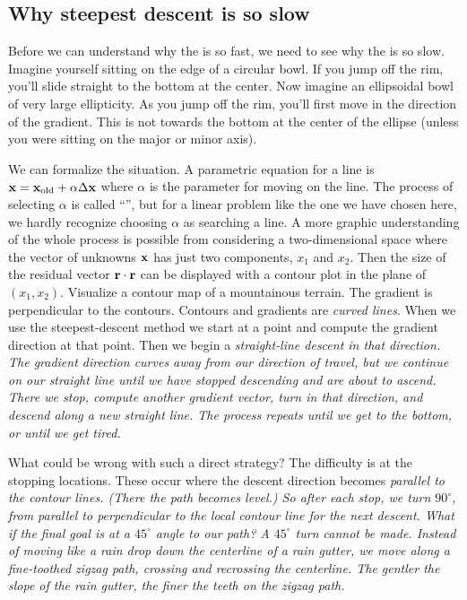 \subsection{Why steepest descent is so slow}
Before we can understand why the  is so fast,
we need to see why the
is so slow.
Imagine yourself sitting on the edge of a circular bowl.
If you jump off the rim, you'll slide straight to the bottom
at the center.
Now imagine an ellipsoidal bowl of very large ellipticity.
As you jump off the rim, you'll first move in the
direction of the gradient.
This is not towards the bottom at the center of the ellipse
(unless you were sitting on the major or minor axis).
\par
We can formalize the situation.
A parametric equation for a line is
$\bold x=\bold x_{\rm old} +\alpha \Delta \bold x$
where $\alpha$ is the parameter for moving on the line.
The process of selecting $\alpha$ is called ``'',
but for a linear problem like the one we have chosen here,
we hardly recognize choosing $\alpha$ as searching a line.
A more graphic understanding of the whole process is possible
from considering a two-dimensional space
where the vector of unknowns $\bold x$
has just two components, $x_1$ and $x_2$.
Then the size of the residual vector $\bold r \cdot \bold r$ can be
displayed with a contour plot in the plane of $(x_1,x_2)$.
Visualize a contour map of a mountainous terrain.
The gradient is perpendicular to the contours.
Contours and gradients are {\it curved lines}.
When we use the steepest-descent method we start at a point
and compute the gradient direction at that point.
Then we begin a %
\it straight-line %
\rm descent in that direction.
The gradient direction curves away from our direction of travel,
but we continue on our straight line
until we have stopped descending and are about to ascend.
There we stop, compute another gradient vector,
turn in that direction, and descend along a new straight line.
The process repeats until we get to the bottom,
or until we get tired.

\par
What could be wrong with such a direct strategy?
The difficulty is at the stopping locations.
These occur where the descent direction
becomes %
\it parallel %
\rm to the contour lines.
(There the path becomes level.)
So after each stop, we turn $90^\circ$,
from parallel to perpendicular to the local contour line
for the next descent.
What if the final goal is at a $45^\circ$ angle to our path?
A $45^\circ$ turn cannot be made.
Instead of moving like a rain drop down the centerline of a rain gutter,
we move along a fine-toothed zigzag path,
crossing and recrossing the centerline.
The gentler the slope of the rain gutter,
the finer the teeth on the zigzag path.


